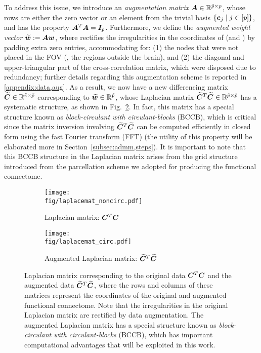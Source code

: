 To address this issue, we introduce an \emph{augmentation matrix} ${\bm{A}}\in\mathbb{R}^{{\tilde{p}}\times p}$, whose rows are either the zero vector or an element from the trivial basis $\left\{\bm{e}_j \; |\; j\in[p]\right\}$, and has the property ${\bm{A}}^T{\bm{A}}={\bm{I}}_p$.
Furthermore, we define the \emph{augmented weight vector} ${\bm{\widetilde{w}}}:={\bm{A}}{\bm{w}}$, where \A rectifies the irregularities in the coordinates of \w (and \x) by padding extra zero entries, accommodating for:
(1) the nodes that were not placed in the FOV (\ie, the regions outside the brain), and
(2) the diagonal and upper-triangular part of the cross-correlation matrix, which were disposed due to redundancy; further details regarding this augmentation scheme is reported in \ref{appendix:data,aug}.
As a result, we now have a new differencing matrix ${\bm{\widetilde{C}}}\in\mathbb{R}^{\tilde{e}\times{\ensuremath{\tilde{p}}}}$ corresponding to ${\bm{\widetilde{w}}}\in\mathbb{R}^{\tilde{p}}$, whose Laplacian matrix ${\bm{\widetilde{C}}}^T{\bm{\widetilde{C}}}\in\mathbb{R}^{{\tilde{p}}\times{\ensuremath{\tilde{p}}}}$ has a systematic structure, as shown in Fig.~\ref{fig:lap,circ}.
In fact, this matrix has a special structure known as \emph{block-circulant with circulant-blocks} (BCCB), which is critical since the matrix inversion involving ${\bm{\widetilde{C}}}^T{\bm{\widetilde{C}}}$ can be computed efficiently in closed form using the fast Fourier transform (FFT) (the utility of this property will be elaborated more in Section~\ref{subsec:admm,steps}).  
It is important to note that this BCCB structure in the Laplacian matrix arises from the grid structure introduced from the parcellation scheme we adopted for producing the functional connectome.

\renewcommand{\imwidth}  {0.38\linewidth}
\begin{figure}
	\centering
	\begin{subfigure}[t]{\imwidth}
		 \centering
		 \texttt{[image: \\fig/laplacemat\_noncirc.pdf]}
		 \caption{Laplacian matrix: ${\bm{C}}^T{\bm{C}}$}
		 \label{fig:lap,noncirc}
	\end{subfigure}
	\hspace{0.05\linewidth}
	\begin{subfigure}[t]{\imwidth}
		 \centering
		 \texttt{[image: \\fig/laplacemat\_circ.pdf]}
		 \caption{Augmented Laplacian matrix: ${\bm{\widetilde{C}}}^T{\bm{\widetilde{C}}}$}
		 \label{fig:lap,circ}
	\end{subfigure}

	\caption{Laplacian matrix corresponding to the original data ${\bm{C}}^T{\bm{C}}$ and the augmented data ${\bm{\widetilde{C}}}^T{\bm{\widetilde{C}}}$, where the rows and columns of these matrices represent the coordinates of the original and augmented functional connectome.  Note that the irregularities in the original Laplacian matrix are rectified by data augmentation.  The augmented Laplacian matrix has a special structure known as \emph{block-circulant with circulant-blocks} (BCCB), which has important computational advantages that will be exploited in this work.}
	 \label{fig:lap}
\end{figure}

